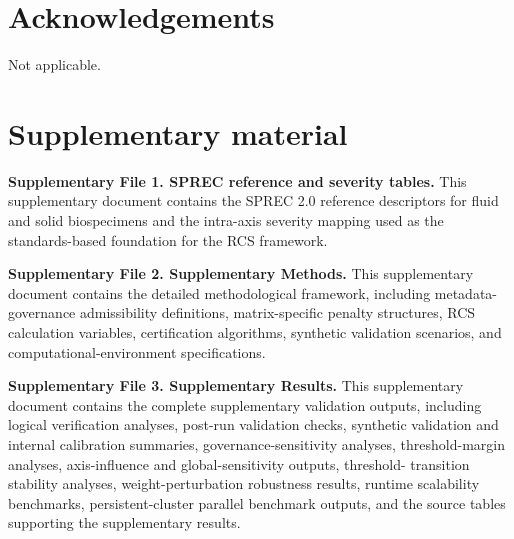 \documentclass[preprint,12pt]{elsarticle}
\begin{document}
\section*{Acknowledgements}

Not applicable.

\section*{Supplementary material}

\noindent\textbf{Supplementary File 1. SPREC reference and severity tables.}
This supplementary document contains the SPREC 2.0 reference descriptors for fluid and solid biospecimens and the intra-axis severity mapping used as the standards-based 
foundation for the RCS framework.

\medskip

\noindent\textbf{Supplementary File 2. Supplementary Methods.}
This supplementary document contains the detailed methodological framework, including metadata-governance admissibility definitions, matrix-specific penalty structures, 
RCS calculation variables, certification algorithms, synthetic validation scenarios, and computational-environment specifications.

\medskip

\noindent\textbf{Supplementary File 3. Supplementary Results.}
This supplementary document contains the complete supplementary validation outputs, including logical verification analyses, post-run validation checks, synthetic 
validation and internal calibration summaries, governance-sensitivity analyses, threshold-margin analyses, axis-influence and global-sensitivity outputs, threshold-
transition stability analyses, weight-perturbation robustness results, runtime scalability benchmarks, persistent-cluster parallel benchmark outputs, and the source 
tables supporting the supplementary results.



\end{document}
